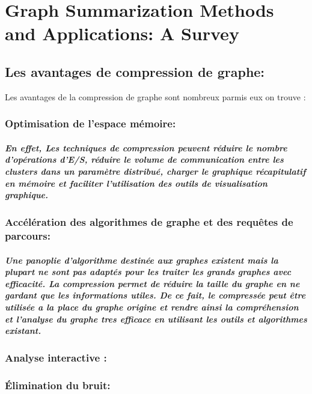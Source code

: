 \documentclass[11pt,a4paper]{report}
\begin{document}
\chapter{Graph Summarization Methods and Applications: A Survey}
\section{Les avantages de compression de graphe:}

Les avantages de la compression de graphe sont nombreux parmis eux on trouve :



\subsection{Optimisation de l'espace mémoire:}
\paragraph{
En effet, Les techniques de compression peuvent réduire le nombre d'opérations d'E/S, réduire le volume de communication entre les clusters dans un paramètre distribué, charger le graphique récapitulatif en mémoire et faciliter l'utilisation des outils de visualisation graphique.}




\subsection{Accélération des algorithmes de graphe et des requêtes de parcours:}
\paragraph{
Une panoplie d'algorithme destinée aux graphes existent mais la plupart  ne sont pas adaptés pour les traiter les grands graphes avec efficacité. La compression permet de réduire la taille du graphe en ne gardant que les informations utiles. De ce fait, le compressée peut être utilisée a la place du graphe origine et rendre ainsi la compréhension et l'analyse du graphe tres efficace en utilisant les outils et algorithmes existant.}





\subsection{Analyse interactive :}

\subsection{Élimination du bruit:}
\end{document}
